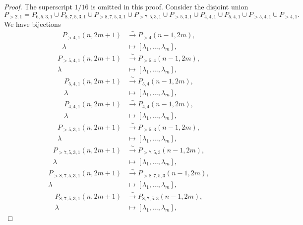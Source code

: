 \documentclass[a4paper, 12pt, reqno]{amsart}
\theoremstyle{remark}
\numberwithin{equation}{subsection}
\begin{document}
\begin{proof}
  The superscript $1/16$ is omitted in this proof.
  Consider the disjoint union
  \begin{equation*}
    P_{>2, 1} = P_{6, 5, 3, 1} \cup P_{8, 7, 5, 3, 1} \cup P_{>8, 7, 5, 3, 1} \cup P_{>7, 5, 3, 1} \cup P_{>5, 3, 1} \cup P_{4, 4, 1} \cup P_{5, 4, 1} \cup P_{>5, 4, 1} \cup P_{>4, 1}.
  \end{equation*}
  We have bijections
  \begin{align*}
    P_{>4, 1}(n, 2m + 1) &\xrightarrow{\sim} P_{>4}(n - 1, 2m), \\
    \lambda &\mapsto [\lambda_1, \dots, \lambda_m],
  \end{align*}
  \begin{align*}
    P_{>5, 4, 1}(n, 2m + 1) &\xrightarrow{\sim} P_{>5, 4}(n - 1, 2m), \\
    \lambda &\mapsto [\lambda_1, \dots, \lambda_m],
  \end{align*}
  \begin{align*}
    P_{5, 4, 1}(n, 2m + 1) &\xrightarrow{\sim} P_{5, 4}(n - 1, 2m), \\
    \lambda &\mapsto [\lambda_1, \dots, \lambda_m],
  \end{align*}
  \begin{align*}
    P_{4, 4, 1}(n, 2m + 1) &\xrightarrow{\sim} P_{4, 4}(n - 1, 2m), \\
    \lambda &\mapsto [\lambda_1, \dots, \lambda_m],
  \end{align*}
  \begin{align*}
    P_{>5, 3, 1}(n, 2m + 1) &\xrightarrow{\sim} P_{>5, 3}(n - 1, 2m), \\
    \lambda &\mapsto [\lambda_1, \dots, \lambda_m],
  \end{align*}
  \begin{align*}
    P_{>7, 5, 3, 1}(n, 2m + 1) &\xrightarrow{\sim} P_{>7, 5, 3}(n - 1, 2m), \\
    \lambda &\mapsto [\lambda_1, \dots, \lambda_m],
  \end{align*}
  \begin{align*}
    P_{>8, 7, 5, 3, 1}(n, 2m + 1) &\xrightarrow{\sim} P_{>8, 7, 5, 3}(n - 1, 2m), \\
    \lambda &\mapsto [\lambda_1, \dots, \lambda_m],
  \end{align*}
  \begin{align*}
    P_{8, 7, 5, 3, 1}(n, 2m + 1) &\xrightarrow{\sim} P_{8, 7, 5, 3}(n - 1, 2m), \\
    \lambda &\mapsto [\lambda_1, \dots, \lambda_m],

\end{align*}
\end{proof}
\end{document}
